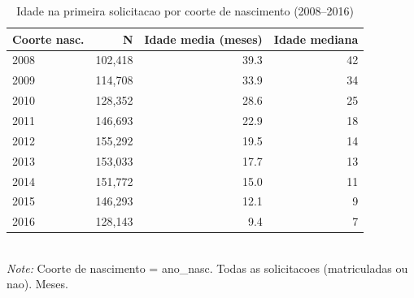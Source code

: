 \begin{table}[htbp]\centering
\caption{Idade na primeira solicitacao por coorte de nascimento (2008--2016)}
\label{tab:R3a_coorte}
\small
\begin{tabular}{lrrr}
\toprule
Coorte nasc. & N & Idade media (meses) & Idade mediana \\
\midrule
2008 & 102,418 & 39.3 & 42 \\
2009 & 114,708 & 33.9 & 34 \\
2010 & 128,352 & 28.6 & 25 \\
2011 & 146,693 & 22.9 & 18 \\
2012 & 155,292 & 19.5 & 14 \\
2013 & 153,033 & 17.7 & 13 \\
2014 & 151,772 & 15.0 & 11 \\
2015 & 146,293 & 12.1 & 9 \\
2016 & 128,143 & 9.4 & 7 \\
\bottomrule
\end{tabular}
\\[3pt]{\footnotesize \textit{Note:} Coorte de nascimento = ano\_nasc. Todas as solicitacoes (matriculadas ou nao). Meses.}
\end{table}
